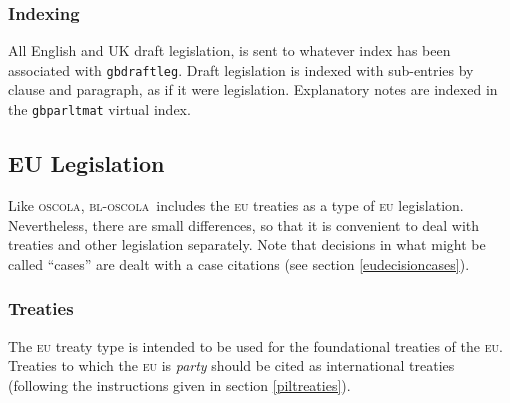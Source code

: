\documentclass[a5paper,fontsize=9pt,DIV=1]{scrartcl}
\newcommand{\oscola}{\textsc{bl-oscola}}
\newcommand{\oscolashort}{\textsc{oscola}\nocite{oscola}}
\begin{document}
\subsubsection{Indexing}

{\sloppy All English and UK draft legislation, is sent to whatever index has been
associated with \verb|gbdraftleg|. Draft legislation is indexed with
sub-entries by clause and paragraph, as if it were
legislation. Explanatory notes are indexed in the \texttt{gbparltmat}
virtual index.}

\subsection{EU Legislation}

Like \oscolashort, \oscola\ includes the \textsc{eu} treaties as a
type of \textsc{eu} legislation. Nevertheless, there are small
differences, so that it is convenient to deal with treaties and other
legislation separately. Note that decisions in what might be called
\enquote{cases} are dealt with a case citations (see section
\ref{eudecisioncases}).

\subsubsection{Treaties}

The \textsc{eu} treaty type is intended to be used for the
foundational treaties of the \textsc{eu}. Treaties to which the
\textsc{eu} is \emph{party} should be cited as international treaties
(following the instructions given in section \ref{piltreaties}).
\end{document}
